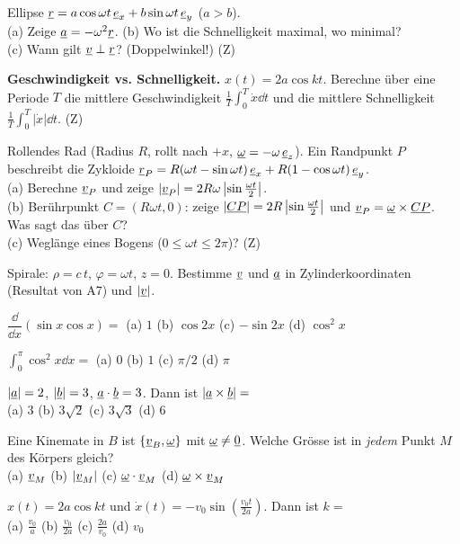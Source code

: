 \documentclass[11pt]{article}
\begin{document}
 Ellipse $\underline{r}=a\cos\omega t\,\underline{e}_{x}+b\sin\omega t\,\underline{e}_{y}$ ($a>b$).\\
(a) Zeige $\underline{a}=-\omega^2\underline{r}$. \quad (b) Wo ist die Schnelligkeit maximal, wo minimal?\\
(c) Wann gilt $\underline{v}\perp\underline{r}$? (Doppelwinkel!) \hfill(Z)

 \textbf{Geschwindigkeit vs. Schnelligkeit.} $x(t)=2a\cos kt$. Berechne über eine Periode $T$ die mittlere Geschwindigkeit $\frac1T\int_0^T\dot x\dd t$ und die mittlere Schnelligkeit $\frac1T\int_0^T|\dot x|\dd t$. \hfill(Z)

 Rollendes Rad (Radius $R$, rollt nach $+x$, $\underline{\omega}=-\omega\,\underline{e}_{z}$). Ein Randpunkt $P$ beschreibt die Zykloide $\underline{r}_P=R(\omega t-\sin\omega t)\,\underline{e}_{x}+R(1-\cos\omega t)\,\underline{e}_{y}$.\\
(a) Berechne $\underline{v}_P$ und zeige $|\underline{v}_P|=2R\omega\left|\sin\frac{\omega t}{2}\right|$.\\
(b) Berührpunkt $C=(R\omega t,0)$: zeige $|\underline{CP}|=2R\left|\sin\frac{\omega t}{2}\right|$ und $\underline{v}_P=\underline{\omega}\times\underline{CP}$. Was sagt das über $C$?\\
(c) Weglänge eines Bogens ($0\le\omega t\le2\pi$)? \hfill(Z)

 Spirale: $\rho=c\,t$, $\varphi=\omega t$, $z=0$. Bestimme $\underline{v}$ und $\underline{a}$ in Zylinderkoordinaten (Resultat von A7) und $|\underline{v}|$.

 $\dfrac{\dd}{\dd x}(\sin x\cos x)=$ \quad (a) $1$ \quad (b) $\cos2x$ \quad (c) $-\sin2x$ \quad (d) $\cos^2x$

 $\int_0^\pi\cos^2x\dd x=$ \quad (a) $0$ \quad (b) $1$ \quad (c) $\pi/2$ \quad (d) $\pi$

 $|\underline{a}|=2$, $|\underline{b}|=3$, $\underline{a}\cdot\underline{b}=3$. Dann ist $|\underline{a}\times\underline{b}|=$\\
(a) $3$ \quad (b) $3\sqrt2$ \quad (c) $3\sqrt3$ \quad (d) $6$

 Eine Kinemate in $B$ ist $\{\underline{v}_B,\underline{\omega}\}$ mit $\underline{\omega}\neq\underline{0}$. Welche Grösse ist in \emph{jedem} Punkt $M$ des Körpers gleich?\\
(a) $\underline{v}_M$ \quad (b) $|\underline{v}_M|$ \quad (c) $\underline{\omega}\cdot\underline{v}_M$ \quad (d) $\underline{\omega}\times\underline{v}_M$

 $x(t)=2a\cos kt$ und $\dot x(t)=-v_0\sin\!\left(\frac{v_0t}{2a}\right)$. Dann ist $k=$\\
(a) $\frac{v_0}{a}$ \quad (b) $\frac{v_0}{2a}$ \quad (c) $\frac{2a}{v_0}$ \quad (d) $v_0$
\end{document}
